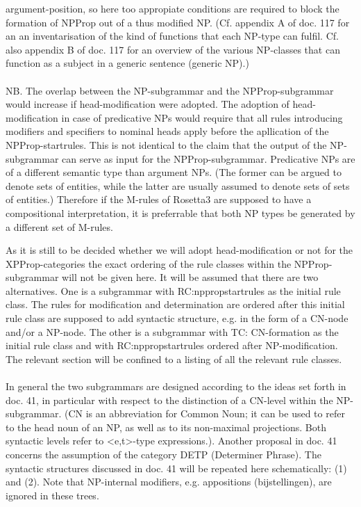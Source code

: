 argument-position, so here too appropiate conditions are required to block the
formation of NPProp out of a thus modified NP. (Cf. appendix A of doc. 117
 for an an
inventarisation of the kind of functions that each NP-type can fulfil.
Cf. also appendix B of doc. 117 for an overview of
the various NP-classes that can function as a subject in a generic sentence
(generic NP).)\\ \\ 
NB. The overlap between the NP-subgrammar and the NPProp-subgrammar would
increase if head-modification were adopted. The adoption of head-modification
in case of predicative NPs would require that all rules introducing modifiers
and specifiers to nominal heads apply before the apllication of the
NPProp-startrules. This is not identical to the claim that the output of the
NP-subgrammar can serve as input for the NPProp-subgrammar. Predicative NPs are
of a different semantic type than argument NPs. (The former can be argued to
denote sets of entities, while the latter are usually assumed to denote sets of
sets of entities.) Therefore if the M-rules of Rosetta3 are supposed to have a
compositional interpretation, it is preferrable that both NP types be generated
by a different set of M-rules. 

As it is still to be decided whether we will adopt head-modification or not for
the XPProp-categories the exact ordering of the rule classes within the
NPProp-subgrammar will not be given here. It will be assumed that there are two
alternatives. One is a subgrammar with RC:nppropstartrules as the initial rule
class. The rules for modification and determination are ordered after this
initial rule class are supposed to add syntactic structure, e.g. in the form of
a CN-node and/or a NP-node. The other is a subgrammar with TC: CN-formation
as the initial rule class and with RC:nppropstartrules ordered after
NP-modification. The relevant section will be confined to a listing of all the
relevant rule classes. 
\\ \\ 
In general the two subgrammars are designed according to the ideas set forth in
doc. 41, in particular with respect to the distinction of a CN-level within the
NP-subgrammar. (CN is an abbreviation for Common Noun; it can be used to refer
to the head noun of an NP, as well as to its non-maximal projections. Both
syntactic levels refer to <e,t>-type expressions.). Another proposal in doc. 41
concerns the assumption of the category DETP (Determiner Phrase). The syntactic
structures discussed in doc. 41 will be repeated here schematically: (1) and
(2). Note that NP-internal modifiers, e.g. appositions (bijstellingen), are
ignored in these trees.

